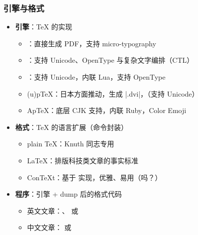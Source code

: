 \begin{frame}[fragile]
  \frametitle{引擎与格式}
  \begin{itemize}
    \item \textbf{引擎}：\TeX{} 的实现

      \begin{itemize}
        \item \pdfTeX{}：直接生成 PDF，支持 micro-typography
        \item \XeTeX{}：支持 Unicode、OpenType 与复杂文字编排（CTL）
        \item \LuaTeX{}：支持 Unicode，内联 Lua，支持 OpenType
        \item (u)p\TeX{}：日本方面推动，生成 |.dvi|，（支持 Unicode）
        \item Ap\TeX{}：底层 CJK 支持，内联 Ruby，Color Emoji
      \end{itemize}

    \item \textbf{格式}：\TeX{} 的语言扩展（命令封装）

      \begin{itemize}
        \item plain \TeX{}：Knuth 同志专用
        \item \LaTeX{}：排版科技类文章的事实标准
        \item Con\TeX t：基于 \LuaTeX{} 实现，优雅、易用（吗？）
      \end{itemize}

    \item \textbf{程序}：引擎 + dump 后的格式代码

      \begin{itemize}
        \item \alert{英文文章：\pdfLaTeX{}、\XeLaTeX{} 或 \LuaLaTeX{}}
        \item \alert{中文文章：\XeLaTeX{} 或 \LuaLaTeX{}}
      \end{itemize}
  \end{itemize}
\end{frame}

